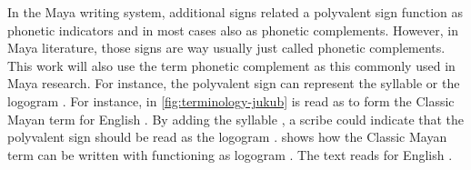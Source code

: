 \documentclass[../main.tex]{subfiles}
\begin{document}
In the Maya writing system, additional signs related a polyvalent sign function 
as phonetic indicators and in most cases also as phonetic complements.
However, in Maya literature, those signs are way usually just called phonetic complements.
This work will also use the term phonetic complement as this commonly used in Maya research.
For instance, the polyvalent sign  can represent the syllable  or the
logogram .
For instance, in \cref{fig:terminology-jukub}  is read as  to form
the Classic Mayan term  for English .
By adding the syllable , a scribe could indicate that the polyvalent sign
should be read as the logogram .
 shows how the Classic Mayan term  
can be written with  functioning as 
logogram .
The text reads  for 
English .
\end{document}
